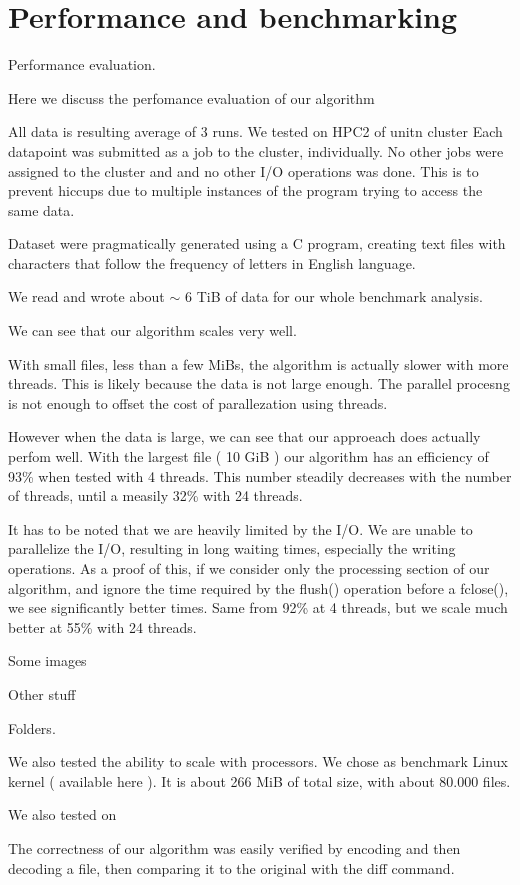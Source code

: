 \section{Performance and benchmarking}
Performance evaluation.

Here we discuss the perfomance evaluation of our algorithm


All data is resulting average of 3 runs.
We tested on HPC2 of unitn cluster
Each datapoint was submitted as a job to the cluster, individually. No other jobs were assigned to the cluster and and no other I/O operations was done. This is to prevent hiccups due to multiple instances of the program trying to access the same data.

Dataset were pragmatically generated using a C program, creating text files with characters that follow the frequency of letters in English language.

We read and wrote about $\sim$ 6 TiB of data for our whole benchmark analysis.

We can see that our algorithm scales very well. 

With small files, less than a few MiBs, the algorithm is actually slower with more threads. This is likely because the data is not large enough. The parallel procesng is not enough to offset the cost of parallezation using threads.

However when the data is large, we can see that our approeach does actually perfom well. With the largest file ( 10 GiB ) our algorithm has an efficiency of 93\% when tested with 4 threads. This number steadily decreases with the number of threads, until a measily 32\% with 24 threads. 

It has to be noted that we are heavily limited by the I/O. We are unable to parallelize the I/O, resulting in long waiting times, especially the writing operations. As a proof of this, if we consider only the processing section of our algorithm, and ignore the time required by the flush() operation before a fclose(), we see significantly better times. Same from 92\% at 4 threads, but we scale much better at 55\% with 24 threads. 

Some images

Other stuff

Folders.

We also tested the ability to scale with processors. We chose as benchmark Linux kernel ( available here ). It is about 266 MiB of total size, with about 80.000 files.


We also tested on


The correctness of our algorithm was easily verified by encoding and then decoding a file, then comparing it to the original with the diff command.